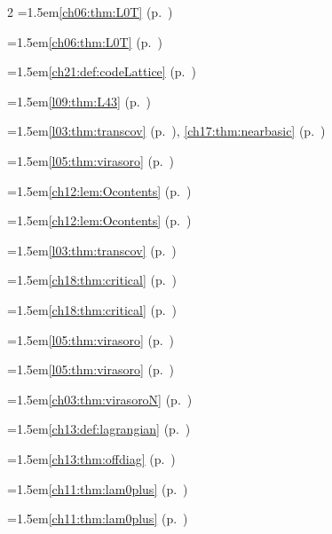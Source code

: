 \begin{multicols}{2}
\hangindent=1.5em\quad \ref{ch06:thm:L0T} (p.~\pageref{ch06:thm:L0T})\par
\hangindent=1.5em\quad \ref{ch06:thm:L0T} (p.~\pageref{ch06:thm:L0T})\par
\hangindent=1.5em\quad \ref{ch21:def:codeLattice} (p.~\pageref{ch21:def:codeLattice})\par
\hangindent=1.5em\quad \ref{l09:thm:L43} (p.~\pageref{l09:thm:L43})\par
\hangindent=1.5em\quad \ref{l03:thm:transcov} (p.~\pageref{l03:thm:transcov}), \ref{ch17:thm:nearbasic} (p.~\pageref{ch17:thm:nearbasic})\par
\hangindent=1.5em\quad \ref{l05:thm:virasoro} (p.~\pageref{l05:thm:virasoro})\par
\hangindent=1.5em\quad \ref{ch12:lem:Ocontents} (p.~\pageref{ch12:lem:Ocontents})\par
\hangindent=1.5em\quad \ref{ch12:lem:Ocontents} (p.~\pageref{ch12:lem:Ocontents})\par
\hangindent=1.5em\quad \ref{l03:thm:transcov} (p.~\pageref{l03:thm:transcov})\par
\hangindent=1.5em\quad \ref{ch18:thm:critical} (p.~\pageref{ch18:thm:critical})\par
\hangindent=1.5em\quad \ref{ch18:thm:critical} (p.~\pageref{ch18:thm:critical})\par
\hangindent=1.5em\quad \ref{l05:thm:virasoro} (p.~\pageref{l05:thm:virasoro})\par
\hangindent=1.5em\quad \ref{l05:thm:virasoro} (p.~\pageref{l05:thm:virasoro})\par
\hangindent=1.5em\quad \ref{ch03:thm:virasoroN} (p.~\pageref{ch03:thm:virasoroN})\par
\hangindent=1.5em\quad \ref{ch13:def:lagrangian} (p.~\pageref{ch13:def:lagrangian})\par
\hangindent=1.5em\quad \ref{ch13:thm:offdiag} (p.~\pageref{ch13:thm:offdiag})\par
\hangindent=1.5em\quad \ref{ch11:thm:lam0plus} (p.~\pageref{ch11:thm:lam0plus})\par
\hangindent=1.5em\quad \ref{ch11:thm:lam0plus} (p.~\pageref{ch11:thm:lam0plus})\par

\end{multicols}
